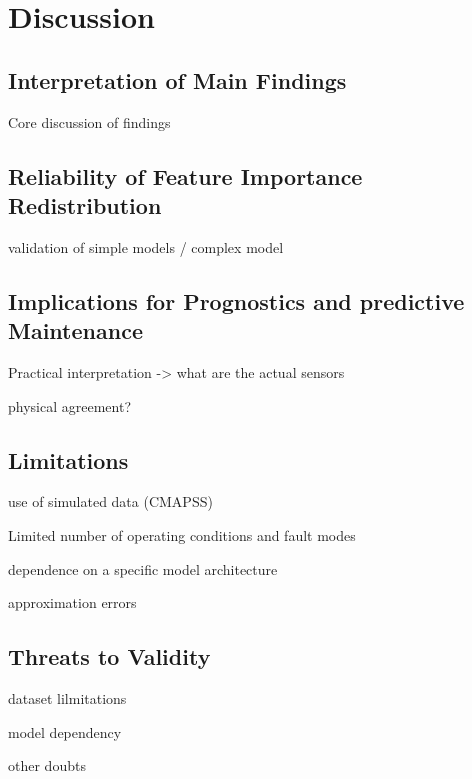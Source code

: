 \cleardoublepage

\chapter{Discussion}
\label{Chapter:Discussion}

\section{Interpretation of Main Findings}
Core discussion of findings

\section{Reliability of Feature Importance Redistribution}
validation of simple models / complex model

\section{Implications for Prognostics and predictive Maintenance}

Practical interpretation -> what are the actual sensors 

physical agreement?

\section{Limitations}
use of simulated data (CMAPSS)

Limited number of operating conditions and fault modes

dependence on a specific model architecture

approximation errors

\section{Threats to Validity}
dataset lilmitations

model dependency

other doubts

